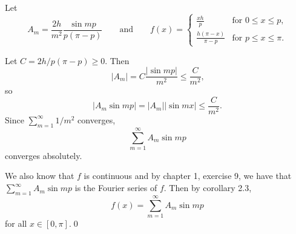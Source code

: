 \documentclass[oneside]{article}
\newcommand\abs[1]{\left|#1\right|}
\begin{document}
Let \[
  A_m = \frac{2h}{m^2}\frac{\sin mp}{p(\pi - p)}
  \qquad\text{and}\qquad
  f(x) = \begin{cases}
    \frac{xh}{p} &\text{for } 0 \leq x \leq p\text{,} \\
    \frac{h(\pi-x)}{\pi-p} &\text{for } p \leq x \leq \pi \text{.}
  \end{cases}
\]

Let $C = 2h/p(\pi-p) \geq 0$. Then \[
  \abs{A_m} = C\frac{\abs{\sin mp}}{m^2} \leq \frac{C}{m^2} \text{,}
\] so \[
  \abs{A_m \sin mp} = \abs{A_m}\abs{\sin mx} \leq \frac{C}{m^2} \text{.}
\] Since $\sum_{m=1}^\infty 1/m^2$ converges, \[
  \sum_{m=1}^\infty A_m \sin mp
\] converges absolutely.

We also know that $f$ is continuous and by chapter 1, exercise 9, we have that
$\sum_{m=1}^\infty A_m \sin mp$ is the Fourier series of $f$. Then by corollary
2.3,\[
  f(x) = \sum_{m=1}^\infty A_m \sin mp
\] for all $x \in [0, \pi]$.\qed
\end{document}
